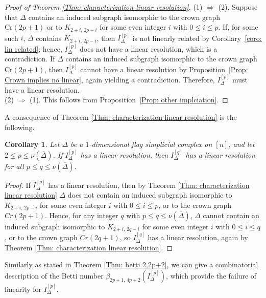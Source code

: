 \documentclass[12pt]{amsart}
\newtheorem{Corollary}[Theorem]{Corollary}
\begin{document}
\begin{proof}[Proof of Theorem \ref{Thm: characterization linear resolution}]
(1) $\Rightarrow$ (2). Suppose that $\Delta$ contains an induced subgraph isomorphic to the crown graph $\mathrm{Cr}(2p+1)$ or to $K_{2+i,\,2p-i}$ for some even integer $i$ with $0 \leq i \leq p$. If, for some such $i$, $\Delta$ contains $K_{2+i,\,2p-i}$, then $I_{\Delta}^{[p]}$ is not linearly related by Corollary~\ref{coro: lin related}; hence, $I_{\Delta}^{[p]}$ does not have a linear resolution, which is a contradiction. If $\Delta$ contains an induced subgraph isomorphic to the crown graph $\mathrm{Cr}(2p+1)$, then $I_{\Delta}^{[p]}$ cannot have a linear resolution by Proposition~\ref{Prop: Crown implies no linear}, again yielding a contradiction. Therefore, $I_{\Delta}^{[p]}$ must have a linear resolution.\\
(2) $\Rightarrow$ (1). This follows from Proposition~\ref{Prop: other implciation}.
\end{proof}

A consequence of Theorem \ref{Thm: characterization linear resolution} is the following.

\begin{Corollary}\label{Coro: lin res for p then lin res for p+1}
Let $\Delta$ be a $1$-dimensional flag simplicial complex on $[n]$, and let
$2 \leq p \leq \nu(\overline{\Delta})$. If $I_{\Delta}^{[p]}$ has a linear resolution, then $I_{\Delta}^{[q]}$ has a linear resolution for all $p\leq q\leq \nu(\overline{\Delta})$.
\end{Corollary}

\begin{proof}
    If $I_{\Delta}^{[p]}$ has a linear resolution, then by Theorem \ref{Thm: characterization linear resolution} $\Delta$ does not contain an induced subgraph isomorphic to $K_{2+i,\,2p-i}$ for some even integer $i$ with $0 \leq i \leq p$, or to the crown graph $Cr(2p+1)$. Hence, for any integer $q$ with $p\leq q\leq \nu(\overline{\Delta})$, $\Delta$ cannot contain an induced subgraph isomorphic to $K_{2+i,\,2q-i}$ for some even integer $i$ with $0 \leq i \leq q$, or to the crown graph $Cr(2q+1)$, so $I_{\Delta}^{[q]}$ has a linear resolution, again by Theorem \ref{Thm: characterization linear resolution}.
\end{proof}


Similarly as stated in Theorem \ref{Thm: betti 2,2p+2}, we can give a combinatorial description of the Betti number $\beta_{2p+1,\,4p+2} (I_{\Delta}^{[p]})$, which provide the failure of linearity for $I_{\Delta}^{[p]}$.
\end{document}
